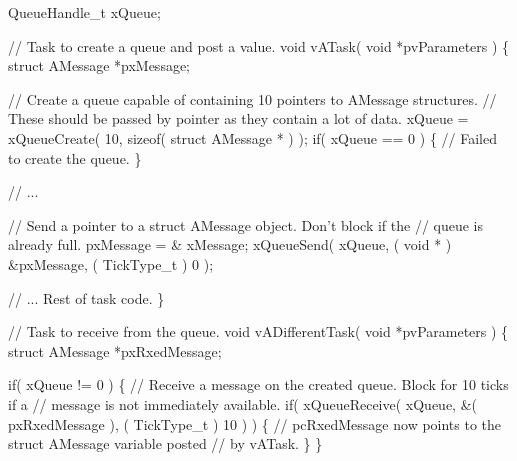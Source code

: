 \begin{DoxyPre}QueueHandle\_t xQueue;\end{DoxyPre}



\begin{DoxyPre}// Task to create a queue and post a value.
void vATask( void *pvParameters )
\{
struct AMessage *pxMessage;\end{DoxyPre}



\begin{DoxyPre}   // Create a queue capable of containing 10 pointers to AMessage structures.
   // These should be passed by pointer as they contain a lot of data.
   xQueue = xQueueCreate( 10, sizeof( struct AMessage * ) );
   if( xQueue == 0 )
   \{
    // Failed to create the queue.
   \}\end{DoxyPre}



\begin{DoxyPre}   // ...\end{DoxyPre}



\begin{DoxyPre}   // Send a pointer to a struct AMessage object.  Don't block if the
   // queue is already full.
   pxMessage = \& xMessage;
   xQueueSend( xQueue, ( void * ) \&pxMessage, ( TickType\_t ) 0 );\end{DoxyPre}



\begin{DoxyPre}   // ... Rest of task code.
\}\end{DoxyPre}



\begin{DoxyPre}// Task to receive from the queue.
void vADifferentTask( void *pvParameters )
\{
struct AMessage *pxRxedMessage;\end{DoxyPre}



\begin{DoxyPre}   if( xQueue != 0 )
   \{
    // Receive a message on the created queue.  Block for 10 ticks if a
    // message is not immediately available.
    if( xQueueReceive( xQueue, \&( pxRxedMessage ), ( TickType\_t ) 10 ) )
    \{
        // pcRxedMessage now points to the struct AMessage variable posted
        // by vATask.
    \}
   \}\end{DoxyPre}



